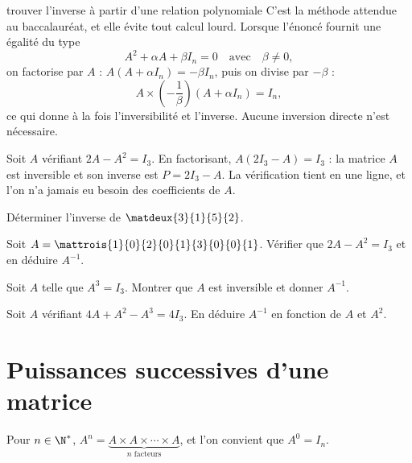 \begin{methode}{trouver l'inverse à partir d'une relation polynomiale}
C'est la méthode attendue au baccalauréat, et elle évite tout calcul lourd.
Lorsque l'énoncé fournit une égalité du type
\[
  A^{2}+\alpha A+\beta I_{n} = 0 \quad\text{avec}\quad \beta \neq 0,
\]
on factorise par $A$ :
$A\left(A+\alpha I_{n}\right) = -\beta I_{n}$, puis on divise par $-\beta$ :
\[
  A \times \left(-\frac{1}{\beta}\right)\left(A+\alpha I_{n}\right) = I_{n},
\]
ce qui donne à la fois l'inversibilité et l'inverse. Aucune inversion directe
n'est nécessaire.
\end{methode}

\begin{exemple}
Soit $A$ vérifiant $2A-A^{2} = I_{3}$. En factorisant,
$A\left(2I_{3}-A\right) = I_{3}$ : la matrice $A$ est inversible et son
inverse est $P = 2I_{3}-A$. La vérification tient en une ligne, et l'on
n'a jamais eu besoin des coefficients de $A$.
\end{exemple}

\begin{entrainement}[inverse]
\exo[\niveau{1}] Déterminer l'inverse de $\matdeux{3}{1}{5}{2}$.

\exo[\niveau{2}] Soit $A = \mattrois{1}{0}{2}{0}{1}{3}{0}{0}{1}$. Vérifier que
$2A-A^{2} = I_{3}$ et en déduire $A^{-1}$.

\exo[\niveau{2}] Soit $A$ telle que $A^{3} = I_{3}$. Montrer que $A$ est
inversible et donner $A^{-1}$.

\exo[\niveau{3}] Soit $A$ vérifiant $4A+A^{2}-A^{3} = 4I_{3}$. En déduire
$A^{-1}$ en fonction de $A$ et $A^{2}$.
\end{entrainement}

\section{Puissances successives d'une matrice}

\begin{definition}[puissance]
Pour $n \in \N^{*}$, $A^{n} = \underbrace{A \times A \times \cdots \times A}_{n
\text{ facteurs}}$, et l'on convient que $A^{0} = I_{n}$.
\end{definition}

